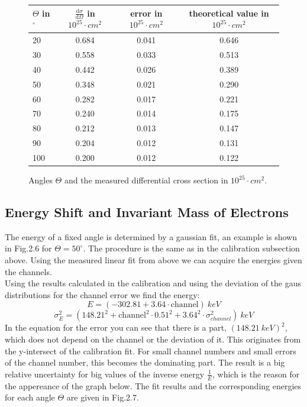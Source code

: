 \begin{figure}[h]
\centering
\caption{Angles $\Theta$ and the measured differential cross section in $10^{25} \cdot cm^{2}$.}
\vspace{0.2cm}
\begin{tabular}{lccc}
$\Theta$ in ${}^{\circ}$ & $\frac{\mathrm{d}\sigma}{\mathrm{d}\Omega}$ in $10^{25} \cdot cm^{2}$ & error in $10^{25} \cdot cm^{2}$ & theoretical value in $10^{25} \cdot cm^{2}$ \\
\hline
\hline
20     &  0.684 & 0.041 & 0.646 \\
30     &  0.558 & 0.033 & 0.513 \\
40     &  0.442 & 0.026 & 0.389 \\
50     &  0.348 & 0.021 & 0.290 \\
60     &  0.282 & 0.017 & 0.221 \\
70     &  0.240 & 0.014 & 0.175 \\
80     &  0.212 & 0.013 & 0.147 \\
90     &  0.204 & 0.012 & 0.131 \\
100    &  0.200 & 0.012 & 0.122 \\
\end{tabular}
\end{figure}

\newpage

\subsection{Energy Shift and Invariant Mass of Electrons}

The energy of a fixed angle is determined by a gaussian fit, an example is shown in Fig.2.6 for $\Theta = 50^{\circ}$. The procedure is the same as in the calibration subsection above. Using the measured linear fit from above we can acquire the energies given the channels.\\
Using the results calculated in the calibration and using the deviation of the gaus distributions for the channel error we find the energy:
$$E = (-302.81 + 3.64 \cdot \mathrm{channel}) \ keV $$
$$\sigma_E^{2} = (148.21^{2} + \mathrm{channel}^{2} \cdot 0.51^{2} + 3.64^{2} \cdot \sigma_{channel}^{2}) \ keV $$
In the equation for the error you can see that there is a part, $(148.21 \ keV)^{2}$, which does not depend on the channel or the deviation of it. This originates from the y-intersect of the calibration fit. For small channel numbers and small errors of the channel number, this becomes the dominating part. The result is a big relative uncertainty for big values of the inverse energy $\frac{1}{E}$, which is the reason for the appereance of the graph below.
The fit results and the corresponding energies for each angle $\Theta$ are given in Fig.2.7.

